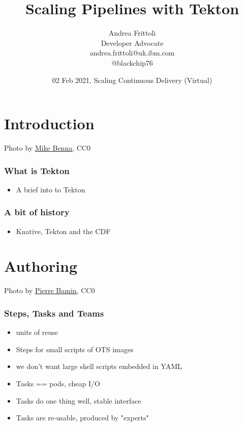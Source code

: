 \documentclass[aspectratio=169,11pt,hyperref={colorlinks=true}]{beamer}
\title{Scaling Pipelines with Tekton}
\date[Scaling Continuous Delivery]{02 Feb 2021, Scaling Continuous Delivery (Virtual)}
\author[Andrea]{
  Andrea Frittoli \\
  Developer Advocate \\
  andrea.frittoli@uk.ibm.com \\
  @blackchip76
}
\begin{document}
\begin{frame}[noframenumbering]
\titlepage{}
\end{frame}

\section{Introduction}

\begin{sectionwithpic}{Photo by \href{https://unsplash.com/@mbenna}{\underline{Mike Benna}}, CC0}
\end{sectionwithpic}

\begin{grayframe}
  \frametitle{What is Tekton}
  \begin{itemize}
    \item A brief into to Tekton
  \end{itemize}
\end{grayframe}

\begin{grayframe}
  \frametitle{A bit of history}
  \begin{itemize}
    \item Knative, Tekton and the CDF
  \end{itemize}
\end{grayframe}

\section{Authoring}

\begin{sectionwithpicrx}{Photo by \href{https://unsplash.com/@bamin}{\underline{Pierre Bamin}}, CC0}
\end{sectionwithpicrx}

\begin{grayframe}
  \frametitle{Steps, Tasks and Teams}
  \begin{itemize}
    \item units of reuse
    \item Steps for small scripts of OTS images
    \item we don't want large shell scripts embedded in YAML
    \item Tasks == pods, cheap I/O
    \item Tasks do one thing well, stable interface
    \item Tasks are re-usable, produced by "experts"
  \end{itemize}
\end{grayframe}
\end{document}
